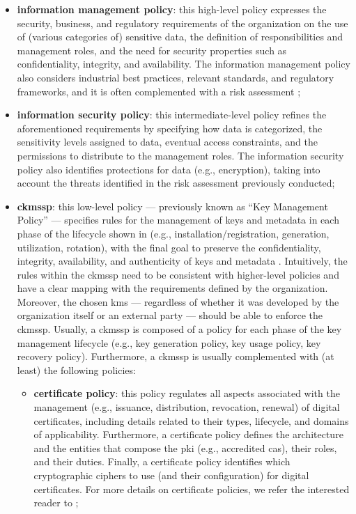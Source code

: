 \begin{itemize}
	\item \textbf{information management policy}: this high-level policy expresses the security, business, and regulatory requirements of the organization on the use of (various categories of) sensitive data, the definition of responsibilities and management roles, and the need for security properties such as confidentiality, integrity, and availability. The information management policy also considers industrial best practices, relevant standards, and regulatory frameworks, and it is often complemented with a risk assessment \cite{joint_guide_2012};
	\item \textbf{information security policy}: this intermediate-level policy refines the aforementioned requirements by specifying how data is categorized, the sensitivity levels assigned to data, eventual access constraints, and the permissions to distribute to the management roles. The information security policy also identifies protections for data (e.g., encryption), taking into account the threats identified in the risk assessment previously conducted;
	\item \textbf{\gls{ckmssp}}: this low-level policy --- previously known as ``Key Management Policy'' --- specifies rules for the management of keys and metadata in each phase of the lifecycle shown in  (e.g., installation/registration, generation, utilization, rotation), with the final goal to preserve the confidentiality, integrity, availability, and authenticity of keys and metadata \cite{barker_recommendation_2019_p2}. Intuitively, the rules within the \gls{ckmssp} need to be consistent with higher-level policies and have a clear mapping with the requirements defined by the organization. Moreover, the chosen \gls{kms} --- regardless of whether it was developed by the organization itself or an external party --- should be able to enforce the \gls{ckmssp}. Usually, a \gls{ckmssp} is composed of a policy for each phase of the key management lifecycle (e.g., key generation policy, key usage policy, key recovery policy). Furthermore, a \gls{ckmssp} is usually complemented with (at least) the following policies:
	\begin{itemize}
		\item \textbf{certificate policy}: this policy regulates all aspects associated with the management (e.g., issuance, distribution, revocation, renewal) of digital certificates, including details related to their types, lifecycle, and domains of applicability. Furthermore, a certificate policy defines the architecture and the entities that compose the \gls{pki} (e.g., accredited \glspl{ca}), their roles, and their duties. Finally, a certificate policy identifies which cryptographic ciphers to use (and their configuration) for digital certificates. For more details on certificate policies, we refer the interested reader to \cite{ford_internet_2003};

\end{itemize}
\end{itemize}
